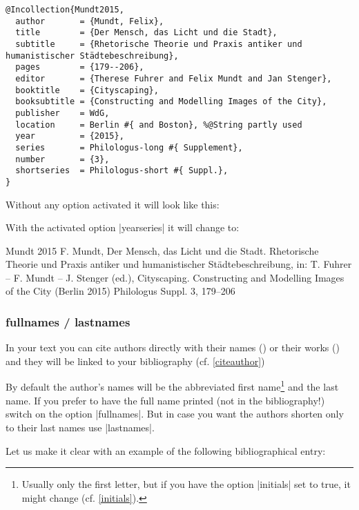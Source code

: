 \documentclass[a4paper,
10pt,
greek,
french,
spanish,
italian,
ngerman,
english
]{ltxdoc}
\begin{document}
 \begin{lstlisting}[style=bibentry,label=Mundt2015,caption={{@}Incollection\{Mundt2015,…\} }]
@Incollection{Mundt2015,
  author       = {Mundt, Felix},
  title        = {Der Mensch, das Licht und die Stadt},
  subtitle     = {Rhetorische Theorie und Praxis antiker und humanistischer Städtebeschreibung},
  pages        = {179--206},
  editor       = {Therese Fuhrer and Felix Mundt and Jan Stenger},
  booktitle    = {Cityscaping},
  booksubtitle = {Constructing and Modelling Images of the City},
  publisher    = WdG,
  location     = Berlin #{ and Boston}, %@String partly used
  year         = {2015},
  series       = Philologus-long #{ Supplement},
  number       = {3},
  shortseries  = Philologus-short #{ Suppl.},
}
\end{lstlisting}

Without any option activated it will look like this:

 
With the activated option  |yearseries| it will change to:
 \begin{bibbsp}
Mundt 2015 \hspace{3em} F. Mundt, Der Mensch, das Licht und die Stadt. Rhetorische Theorie und Praxis antiker und humanistischer Städtebeschreibung, in: T. Fuhrer – F. Mundt – J. Stenger (ed.), Cityscaping. Constructing and Modelling Images of the City (Berlin 2015) {\color{red}Philologus Suppl. 3,} 179–206
\end{bibbsp}

\subsubsection{fullnames / lastnames}\label{fullnames}\label{lastnames}
In your text you can cite authors directly with their names () or their works  () and they will be linked to your bibliography (cf. \cref{citeauthor})

By default the author’s names will be the abbreviated first name\footnote{Usually only the first letter, but if you have the option |initials| set to true, it might change (cf. \cref{initials}).} and the last name.
If you prefer to have the full name printed (not in the bibliography!) switch on the option |fullnames|.
But in case you want the authors shorten only to their last names use |lastnames|.

Let us make it clear with an example of the following bibliographical entry:
\end{document}
